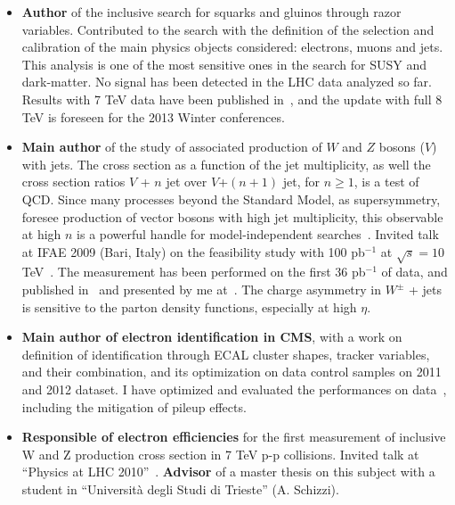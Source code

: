 \documentclass[11pt,twoside,a4paper]{article}
\begin{document}
\begin{enumerate}
\begin {itemize}
  \item {\bf Author} of the inclusive search for squarks and gluinos
    through razor variables. Contributed to the search with the
    definition of the selection and calibration of the main physics
    objects considered: electrons, muons and jets. This analysis is
    one of the most sensitive ones in the search for SUSY and
    dark-matter. No signal has been detected in the LHC data analyzed
    so far. Results with 7 TeV data have been published
    in~\cite{Chatrchyan:2011ek}, and the update with full 8 TeV is
    foreseen for the 2013 Winter conferences.

  \item {\bf Main author} of the study of associated production of $W$
    and $Z$ bosons ($V$) with jets. The cross section as a function of
    the jet multiplicity, as well the cross section ratios $V$ + $n$
    jet over $V$+$(n+1)$ jet, for $n \ge 1$, is a test of QCD.  Since
    many processes beyond the Standard Model, as supersymmetry,
    foresee production of vector bosons with high jet multiplicity,
    this observable at high $n$ is a powerful handle for
    model-independent searches~\cite{proc_ifae,pas_Zjets,pas_Wjets}.
    Invited talk at IFAE 2009 (Bari, Italy) on the feasibility study
    with 100 pb$^{-1}$ at $\sqrt{s}=10$
    TeV~\cite{proc_ifae,conf_ifae09}.  The measurement has been
    performed on the first 36 pb$^{-1}$ of data, and published
    in~\cite{cms_vecbos_paper} and presented by me
    at~\cite{conf_lishep}. The charge asymmetry in $W^\pm$ + jets is
    sensitive to the parton density functions, especially at high
    $\eta$. 
    
  \item {\bf Main author of electron identification in CMS}, with a
    work on definition of identification through ECAL cluster shapes,
    tracker variables, and their combination, and its optimization on
    data control samples on 2011 and 2012 dataset. I have optimized
    and evaluated the performances on
    data~\cite{pas_idelectrons,AN_2009_178}, including the mitigation
    of pileup effects.

  \item {\bf Responsible of electron efficiencies} for the first
    measurement of inclusive W and Z production cross section in 7 TeV
    p-p collisions.  Invited talk at ``Physics at LHC
    2010''~\cite{conf_plhc,proc_plhc}. {\bf Advisor} of a master
    thesis on this subject with a student in ``Universit\`a degli
    Studi di Trieste'' (A. Schizzi).


\end{itemize}
\end{enumerate}
\end{document}
